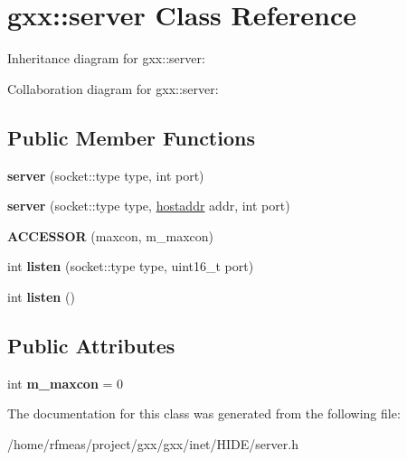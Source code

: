 \hypertarget{classgxx_1_1server}{}\section{gxx\+:\+:server Class Reference}
\label{classgxx_1_1server}


Inheritance diagram for gxx\+:\+:server\+:


Collaboration diagram for gxx\+:\+:server\+:
\subsection*{Public Member Functions}
\begin{DoxyCompactItemize}
\item 
{\bfseries server} (socket\+::type type, int port)\hypertarget{classgxx_1_1server_ab2ea50b6e7c62843d0ddcac10329f2c0}{}\label{classgxx_1_1server_ab2ea50b6e7c62843d0ddcac10329f2c0}

\item 
{\bfseries server} (socket\+::type type, \hyperlink{classgxx_1_1hostaddr}{hostaddr} addr, int port)\hypertarget{classgxx_1_1server_a66adb3fb28136d964eff73037d75c218}{}\label{classgxx_1_1server_a66adb3fb28136d964eff73037d75c218}

\item 
{\bfseries A\+C\+C\+E\+S\+S\+OR} (maxcon, m\+\_\+maxcon)\hypertarget{classgxx_1_1server_a26a3c3fc5848d15c31a3f85682be973f}{}\label{classgxx_1_1server_a26a3c3fc5848d15c31a3f85682be973f}

\item 
int {\bfseries listen} (socket\+::type type, uint16\+\_\+t port)\hypertarget{classgxx_1_1server_a9fb7346211f29233ac15bbfd680139b6}{}\label{classgxx_1_1server_a9fb7346211f29233ac15bbfd680139b6}

\item 
int {\bfseries listen} ()\hypertarget{classgxx_1_1server_a8c6e660a1506e2a040d8fb09eae07618}{}\label{classgxx_1_1server_a8c6e660a1506e2a040d8fb09eae07618}

\end{DoxyCompactItemize}
\subsection*{Public Attributes}
\begin{DoxyCompactItemize}
\item 
int {\bfseries m\+\_\+maxcon} = 0\hypertarget{classgxx_1_1server_a3696a8e6134e63ac6f0f98425b9ed0c1}{}\label{classgxx_1_1server_a3696a8e6134e63ac6f0f98425b9ed0c1}

\end{DoxyCompactItemize}


The documentation for this class was generated from the following file\+:\begin{DoxyCompactItemize}
\item 
/home/rfmeas/project/gxx/gxx/inet/\+H\+I\+D\+E/server.\+h\end{DoxyCompactItemize}
